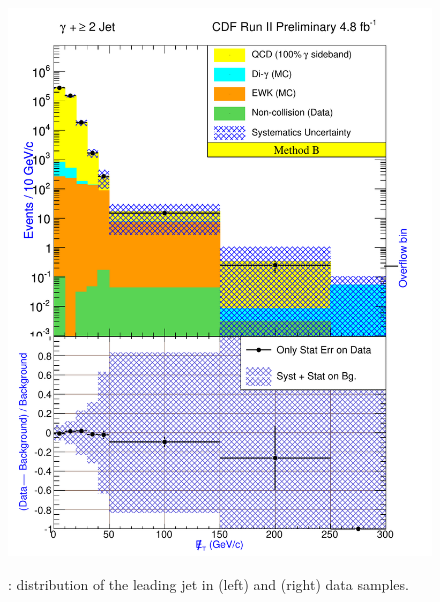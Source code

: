 \documentclass[11pt]{article}
\begin{document}
\begin{figure}[h!]
{ \includegraphics[scale=\resultsHistScale,keepaspectratio=true]{./g30jet_MtdB_plot2_Met.pdf}
}
 \caption{: \met distribution of the leading jet in \phoonejet (left) and \photwojet (right) data samples.}
 \label{fig:Result_MtdB_gj1_Met}
\end{figure}
\end{document}
